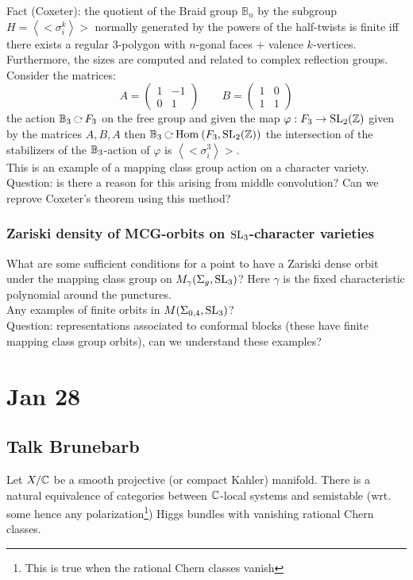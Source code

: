 \documentclass[12pt]{article}
\begin{document}
Fact (Coxeter): the quotient of the Braid group $\mathbb{B}_n$ by the subgroup $H = \left<< \sigma_i^k \right>>$ normally generated by the powers of the half-twists is finite iff there exists a regular $3$-polygon with $n$-gonal faces + valence $k$-vertices. Furthermore, the sizes are computed and related to complex reflection groups. 
\\
Consider the matrices:
\[ A = 
\begin{pmatrix}
1 & -1
\\
0 & 1 
\end{pmatrix}
\quad \quad B = \begin{pmatrix}
1 & 0
\\
1 & 1
\end{pmatrix} \]
the action $\B_3 \acts F_3$ on the free group and given the map $\varphi : F_3 \to \mathrm{SL}_2(\mathbb{Z})$ given by the matrices $A, B, A$ then $\B_3 \acts \Hom{}{F_3}{\SL_2(\ZZ)}$ the intersection of the stabilizers of the $\mathbb{B}_3$-action of $\varphi$ is $\left<< \sigma_i^3 \right>>$. 
\\
This is an example of a mapping class group action on a character variety. Question: is there a reason for this arising from middle convolution? Can we reprove Coxeter's theorem using this method?

\subsubsection{Zariski density of MCG-orbits on $\mathrm{SL}_3$-character varieties}

What are some sufficient conditions for a point to have a Zariski dense orbit under the mapping class group on $M_\gamma(\Sigma_g, \mathrm{SL}_3)$? Here $\gamma$ is the fixed characteristic polynomial around the punctures. 
\\
Any examples of finite orbits in $M(\Sigma_{0,4}, \mathrm{SL}_3)$?
\\
Question: representations associated to conformal blocks (these have finite mapping class group orbits), can we understand these examples?


\section{Jan 28}

\subsection{Talk Brunebarb}

\begin{theorem}
Let $X / \mathbb{C}$ be a smooth projective (or compact Kahler) manifold. There is a natural equivalence of categories between $\mathbb{C}$-local systems and semistable (wrt. some hence any polarization\footnote{This is true when the rational Chern classes vanish}) Higgs bundles with vanishing rational Chern classes. 
\end{theorem}
\end{document}
